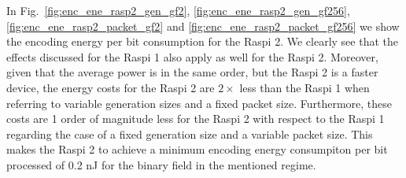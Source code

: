 %
In Fig.~\ref{fig:enc_ene_rasp2_gen_gf2}, \ref{fig:enc_ene_rasp2_gen_gf256},
\ref{fig:enc_ene_rasp2_packet_gf2} and \ref{fig:enc_ene_rasp2_packet_gf256}
we show the encoding energy per bit consumption for the \ac{Raspi} 2.
We clearly see that the effects discussed for the \ac{Raspi} 1 also apply
as well for the \ac{Raspi} 2. Moreover, given that the average power
is in the same order, but the \ac{Raspi} 2 is a faster device,
the energy costs for the \ac{Raspi} 2 are $2\times$ less than the \ac{Raspi} 1
when referring to variable generation sizes and a fixed packet size.
Furthermore, these costs are 1 order of magnitude less for the \ac{Raspi} 2
with respect to the \ac{Raspi} 1 regarding the case of a fixed generation
size and a variable packet size. This makes the \ac{Raspi} 2 to achieve
a minimum encoding energy consumpiton per bit processed of 0.2 nJ for the
binary field in the mentioned regime.

